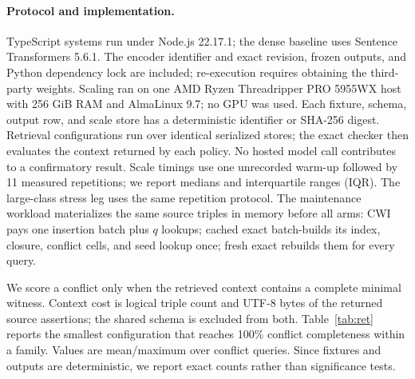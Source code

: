 \documentclass[letterpaper]{article} %
\newcommand{\cwi}{\textsc{CWI}}
\begin{document}
\paragraph{Protocol and implementation.}
TypeScript systems run under Node.js 22.17.1; the dense baseline uses
Sentence Transformers 5.6.1.  The encoder identifier and exact revision,
frozen outputs, and Python dependency lock are included; re-execution requires
obtaining the third-party weights.  Scaling ran on one AMD Ryzen
Threadripper PRO 5955WX host with 256 GiB RAM and AlmaLinux 9.7; no GPU was
used.  Each fixture, schema, output row, and scale store has a deterministic
identifier or SHA-256 digest.  Retrieval configurations
run over identical serialized stores; the exact checker then evaluates the
context returned by each policy.  No hosted model call contributes to a
confirmatory result.  Scale timings use one unrecorded warm-up followed by 11
measured repetitions; we report medians and interquartile ranges (IQR).
The large-class stress leg uses the same repetition protocol.
The maintenance workload materializes the same source triples in memory
before all arms: \cwi{} pays one insertion batch plus $q$ lookups; cached exact
batch-builds its index, closure, conflict cells, and seed lookup once; fresh
exact rebuilds them for every query.

We score a conflict only when the retrieved context contains a complete
minimal witness.  Context cost is logical triple count and UTF-8 bytes of the
returned source assertions; the shared schema is excluded from both.
Table~\ref{tab:ret}
reports the smallest configuration that reaches 100\% conflict completeness
within a family.  Values are mean/maximum over conflict queries.  Since
fixtures and outputs are deterministic, we report exact counts rather than
significance tests.
\end{document}
